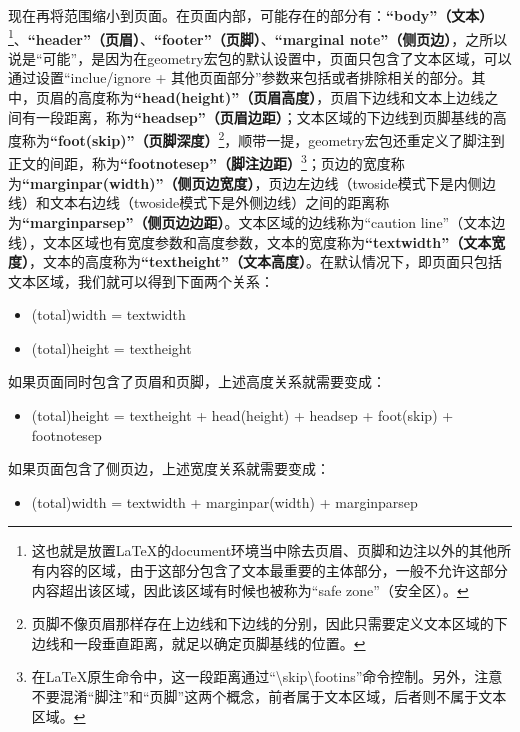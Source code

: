 ﻿\documentclass{article}
\begin{document}
现在再将范围缩小到页面。在页面内部，可能存在的部分有：\textbf{``body''（文本）}\footnote{这也就是放置\LaTeX 的document环境当中除去页眉、页脚和边注以外的其他所有内容的区域，由于这部分包含了文本最重要的主体部分，一般不允许这部分内容超出该区域，因此该区域有时候也被称为``safe zone''（安全区）。}、\textbf{``header''（页眉）}、\textbf{``footer''（页脚）}、\textbf{``marginal note''（侧页边）}，之所以说是``可能''，是因为在geometry宏包的默认设置中，页面只包含了文本区域，可以通过设置``inclue/ignore + 其他页面部分''参数来包括或者排除相关的部分。其中，页眉的高度称为\textbf{``head(height)''（页眉高度）}，页眉下边线和文本上边线之间有一段距离，称为\textbf{``headsep''（页眉边距）}；文本区域的下边线到页脚基线的高度称为\textbf{``foot(skip)''（页脚深度）}\footnote{页脚不像页眉那样存在上边线和下边线的分别，因此只需要定义文本区域的下边线和一段垂直距离，就足以确定页脚基线的位置。}，顺带一提，geometry宏包还重定义了脚注到正文的间距，称为\textbf{``footnotesep''（脚注边距）}\footnote{在\LaTeX 原生命令中，这一段距离通过``\textbackslash skip\textbackslash footins''命令控制。另外，注意不要混淆``脚注''和``页脚''这两个概念，前者属于文本区域，后者则不属于文本区域。}；页边的宽度称为\textbf{``marginpar(width)''（侧页边宽度）}，页边左边线（twoside模式下是内侧边线）和文本右边线（twoside模式下是外侧边线）之间的距离称为\textbf{``marginparsep''（侧页边边距）}。文本区域的边线称为``caution line''（文本边线），文本区域也有宽度参数和高度参数，文本的宽度称为\textbf{``textwidth''（文本宽度）}，文本的高度称为\textbf{``textheight''（文本高度）}。在默认情况下，即页面只包括文本区域，我们就可以得到下面两个关系：
\begin{itemize}
    \item (total)width = textwidth
    \item (total)height = textheight
\end{itemize}
如果页面同时包含了页眉和页脚，上述高度关系就需要变成：
\begin{itemize}
    \item (total)height = textheight + head(height) + headsep + foot(skip) + footnotesep
\end{itemize}
如果页面包含了侧页边，上述宽度关系就需要变成：
\begin{itemize}
    \item (total)width = textwidth + marginpar(width) + marginparsep
\end{itemize}

\end{document}
